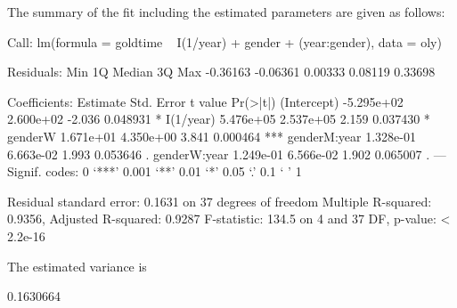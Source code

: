 \documentclass[12pt]{article}
\begin{document}
The summary of the fit including the estimated parameters are given as follows:
\begin{Schunk}
\begin{Soutput}
Call:
lm(formula = goldtime ~ I(1/year) + gender + (year:gender), data = oly)

Residuals:
     Min       1Q   Median       3Q      Max 
-0.36163 -0.06361  0.00333  0.08119  0.33698 

Coefficients:
               Estimate Std. Error t value Pr(>|t|)    
(Intercept)  -5.295e+02  2.600e+02  -2.036 0.048931 *  
I(1/year)     5.476e+05  2.537e+05   2.159 0.037430 *  
genderW       1.671e+01  4.350e+00   3.841 0.000464 ***
genderM:year  1.328e-01  6.663e-02   1.993 0.053646 .  
genderW:year  1.249e-01  6.566e-02   1.902 0.065007 .  
---
Signif. codes:  0 ‘***’ 0.001 ‘**’ 0.01 ‘*’ 0.05 ‘.’ 0.1 ‘ ’ 1 

Residual standard error: 0.1631 on 37 degrees of freedom
Multiple R-squared: 0.9356,	Adjusted R-squared: 0.9287 
F-statistic: 134.5 on 4 and 37 DF,  p-value: < 2.2e-16 
\end{Soutput}
\end{Schunk}
The estimated variance is
\begin{Schunk}
\begin{Soutput}
[1] 0.1630664
\end{Soutput}
\end{Schunk}
\end{document}

